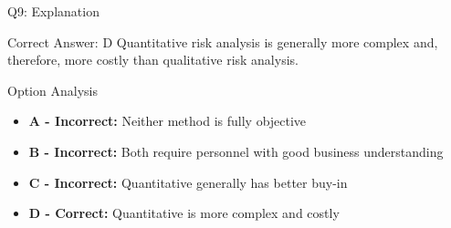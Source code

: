 \documentclass{beamer}
\begin{document}
	\begin{frame}{Q9: Explanation}
		\begin{block}{Correct Answer: D}
			Quantitative risk analysis is generally more complex and, therefore, more costly than qualitative risk analysis.
		\end{block}
		\begin{block}{Option Analysis}
			\begin{itemize}
				\item \textbf{A - Incorrect:} Neither method is fully objective
				\item \textbf{B - Incorrect:} Both require personnel with good business understanding
				\item \textbf{C - Incorrect:} Quantitative generally has better buy-in
				\item \textbf{D - Correct:} Quantitative is more complex and costly
			\end{itemize}
		\end{block}
	\end{frame}
	
\end{document}
